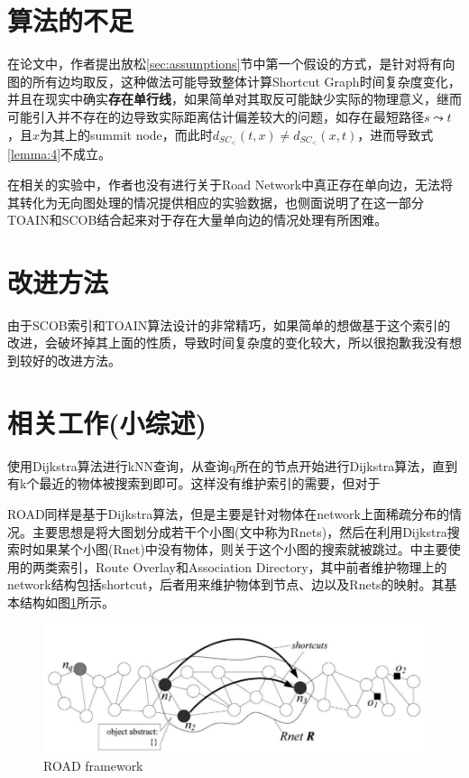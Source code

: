 \documentclass{ML}
\begin{document}
\section{算法的不足}\label{sec:shortcoming}
在论文中，作者提出放松\ref{sec:assumptions}节中第一个假设的方式，是针对将有向图的所有边均取反，这种做法可能导致整体计算Shortcut Graph时间复杂度变化，并且在现实中确实\textbf{存在单行线}，如果简单对其取反可能缺少实际的物理意义，继而可能引入并不存在的边导致实际距离估计偏差较大的问题，如存在最短路径$s \leadsto t$，且$x$为其上的summit node，而此时$d_{SC_{<}}(t, x) \neq d_{SC_{<}}(x, t)$，进而导致式\eqref{lemma:4}不成立。

在相关的实验中，作者也没有进行关于Road Network中真正存在单向边，无法将其转化为无向图处理的情况提供相应的实验数据，也侧面说明了在这一部分TOAIN和SCOB结合起来对于存在大量单向边的情况处理有所困难。
\section{改进方法}
由于SCOB索引和TOAIN算法设计的非常精巧，如果简单的想做基于这个索引的改进，会破坏掉其上面的性质，导致时间复杂度的变化较大，所以很抱歉我没有想到较好的改进方法。
\section{相关工作(小综述)}
使用Dijkstra算法进行kNN查询，从查询q所在的节点开始进行Dijkstra算法，直到有k个最近的物体被搜索到即可。这样没有维护索引的需要，但对于

ROAD\cite{ROAD}同样是基于Dijkstra算法，但是主要是针对物体在network上面稀疏分布的情况。主要思想是将大图划分成若干个小图(文中称为Rnets)，然后在利用Dijkstra搜索时如果某个小图(Rnet)中没有物体，则关于这个小图的搜索就被跳过。\cite{ROAD}中主要使用的两类索引，Route Overlay和Association Directory，其中前者维护物理上的network结构包括shortcut，后者用来维护物体到节点、边以及Rnets的映射。其基本结构如图\ref{fig:ROAD}所示。
\begin{figure}[htb]
	\centering
	\includegraphics[width=0.8\linewidth]{media/ROAD.png}
	\caption{ROAD framework}\label{fig:ROAD}
\end{figure}
\end{document}
